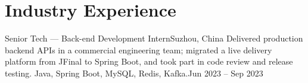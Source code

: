 \section{Industry Experience}
  \resumeSubHeadingListStart
    \resumeSubheading
      {Senior Tech --- Back-end Development Intern}{Suzhou, China}
      {Delivered production backend APIs in a commercial engineering team; migrated a live delivery platform from JFinal to Spring Boot, and took part in code review and release testing. Java, Spring Boot, MySQL, Redis, Kafka.}{Jun 2023 -- Sep 2023}
  \resumeSubHeadingListEnd
